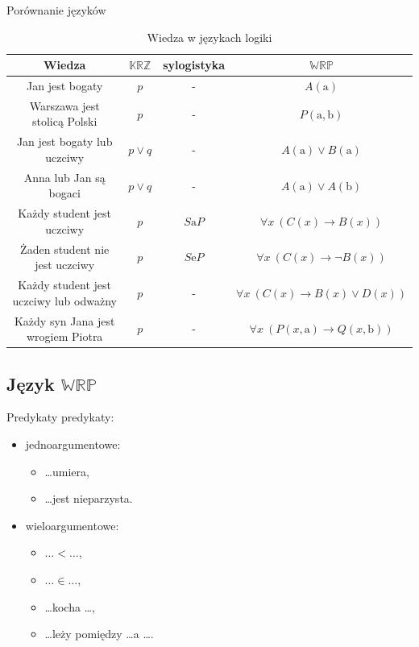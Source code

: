 \documentclass{beamer}
\newcommand {\KRZ} {\ensuremath{\mathbb{KRZ}}}
\newcommand {\WRP} {\ensuremath{\mathbb{WRP}}}
\begin{document}
\begin{frame}{Porównanie języków}
\begin{table}[p]
\begin{center}
{\scriptsize
\begin{tabular}{|c||c|c|c|}
\hline
\textbf{Wiedza} & \KRZ & \textbf{sylogistyka} & \WRP \\
\hline
Jan jest bogaty & $p$ & - & $A(\textrm{a})$ \\
\hline
Warszawa jest stolicą Polski & $p$ & - & $P(\textrm{a}, \textrm{b})$\\
\hline
Jan jest bogaty lub uczciwy & $p \lor q$ & - & $A(\textrm{a}) \lor B(\textrm{a})$\\
\hline
Anna lub Jan są bogaci & $p \lor q$ & - & $A(\textrm{a}) \lor A(\textrm{b})$\\
\hline
Każdy student jest uczciwy & $p$ & $S\textrm{a}P$ & $\forall x~(C(x) \to B(x))$ \\
\hline
Żaden student nie jest uczciwy & $p$ & $S\textrm{e}P$ & $\forall x~(C(x) \to \neg B(x))$ \\
\hline
Każdy student jest uczciwy lub odważny & $p$ & - & $\forall x~(C(x) \to B(x) \lor D(x))$ \\
\hline
Każdy syn Jana jest wrogiem Piotra & $p$ & - & $\forall x~(P(x,\textrm{a}) \to Q(x,\textrm{b}))$ \\
\hline
\end{tabular}
}
\caption{Wiedza w językach logiki}
\label{Comparison}

\end{center}

\end{table}
\end{frame}

\subsection{Język \WRP}

\begin{frame}{Predykaty}
predykaty:
%
\begin{itemize}
\item jednoargumentowe:
\begin{itemize}
\item \dots umiera,
\item \dots jest nieparzysta.
\end{itemize}
%
\item wieloargumentowe:
\begin{itemize}
\item $\dots < \dots$,
\item $\dots \in \dots$,
%
\item \dots kocha \dots,
%
\item \dots leży pomiędzy \dots a \dots.
\end{itemize}
\end{itemize}
\end{frame}
\end{document}
